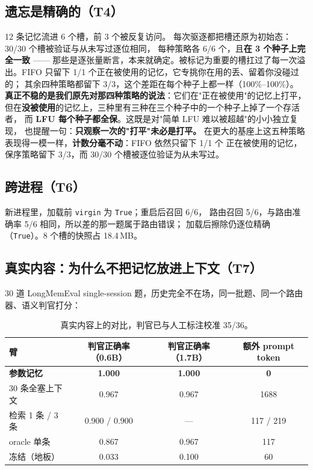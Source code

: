 \documentclass[11pt]{ctexart}
\begin{document}
\subsection{遗忘是精确的（T4）}
12 条记忆流进 6 个槽，前 $3$ 个被反复访问。
每次驱逐都把槽还原为初始态：30/30 个槽被验证与从未写过逐位相同，
每种策略各 6/6 个，且\textbf{在 3 个种子上完全一致} ——
那些是逐张量断言，本来就确定。被标记为重要的槽扛过了每一次溢出。FIFO 只留下
1/1 个正在被使用的记忆，它专挑你在用的丢、留着你没碰过的；
其余四种策略都留下 3/3，这个差距在每个种子上都一样（100\%--100\%）。
\textbf{真正不稳的是我们原先对那四种策略的说法}：它们在"正在被使用"的记忆上打平，
但在\textbf{没被使用}的记忆上，三种里有三种在三个种子中的一个种子上掉了一个存活者，
而 \textbf{LFU 每个种子都全保}。这既是对"简单 LFU 难以被超越"的小小独立复现，
也提醒一句：\textbf{只观察一次的"打平"未必是打平。}
在更大的基座上这五种策略表现得一模一样，\textbf{计数分毫不动}：FIFO 依然只留下 1/1 个
正在被使用的记忆，保序策略留下 3/3，而 30/30 个槽被逐位验证为从未写过。

\subsection{跨进程（T6）}
新进程里，加载前 \texttt{virgin} 为 \texttt{True}；重启后召回 6/6，
路由召回 5/6，与路由准确率 5/6 相同，所以差的那一题属于路由错误；
加载后擦除仍逐位精确（\texttt{True}）。8 个槽的快照占
18.4\,MB。

\subsection{真实内容：为什么不把记忆放进上下文（T7）}
30 道 LongMemEval single-session 题，历史完全不在场，同一批题、同一个路由器、语义判官打分：

\begin{table}[h]\centering\small
\begin{tabular}{lccc}\toprule
臂 & 判官正确率（0.6B） & 判官正确率（1.7B） & 额外 prompt token \\ \midrule
\textbf{参数记忆} & \textbf{1.000} & \textbf{1.000} & \textbf{0} \\
30 条全塞上下文 & 0.967 & 0.967 & 1688 \\
检索 1 条 / 3 条 & 0.900 / 0.900 & --- & 117 / 219 \\
oracle 单条 & 0.867 & 0.967 & 117 \\
冻结（地板） & 0.033 & 0.100 & 60 \\ \bottomrule
\end{tabular}
\caption{真实内容上的对比，判官已与人工标注校准 35/36。}
\end{table}
\end{document}
